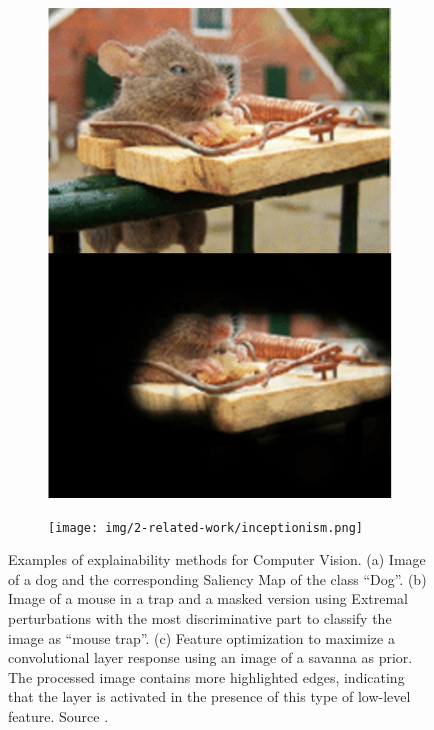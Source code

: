 \begin{figure}
\begin{subfigure}{0.3\columnwidth}
    \includegraphics[width=0.95\columnwidth]{img/2-related-work/mouse-extremal-perturbations.png}
    \caption{}
    \label{fig:example-interpretability-2}
  \end{subfigure}
  \begin{subfigure}{0.3\columnwidth}
    \texttt{[image: img/2-related-work/inceptionism.png]}
    \caption{}
    \label{fig:example-interpretability-3}
  \end{subfigure}
  \caption[Examples of explainability methods for Computer Vision]{Examples of explainability methods for Computer Vision. (a) Image of a dog and the corresponding Saliency Map \cite{Simonyan2013DeepIC} of the class ``Dog''. (b) Image of a mouse in a trap and a masked version using Extremal perturbations \cite{Fong2019} with the most discriminative part to classify the image as ``mouse trap''. (c) Feature optimization to maximize a convolutional layer response \cite{Mordvintsev2015InceptionismGD} using an image of a savanna as prior. The processed image contains more highlighted edges, indicating that the layer is activated in the presence of this type of low-level feature. Source \cite{Simonyan2013DeepIC, Fong2019, Mordvintsev2015InceptionismGD}.}
  \label{fig:example-interpretability}
  \end{figure}

